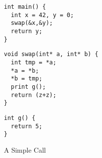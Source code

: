 \begin{figure}[b]
    \begin{minipage}{.35\textwidth}
\begin{verbatim}
int main() {
  int x = 42, y = 0;
  swap(&x,&y);
  return y;
}
\end{verbatim}
    \end{minipage}
    \begin{minipage}{.35\textwidth}
\begin{verbatim}
void swap(int* a, int* b) {
  int tmp = *a;
  *a = *b;
  *b = tmp;
  print g();
  return (z+z);
}
\end{verbatim}
    \end{minipage}
    \begin{minipage}{.25\textwidth}
\begin{verbatim}
int g() {
  return 5;
}
\end{verbatim}
    \end{minipage}
\caption{A Simple Call}
\label{fig:share-program}
\end{figure}

\newcommand{\mainpassc}{magenta}
\newcommand{\sharec}{lgray}


